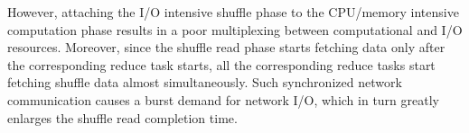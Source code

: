 However, attaching the I/O intensive shuffle phase to the CPU/memory intensive computation phase results in a poor multiplexing between computational and I/O resources.
Moreover, since the shuffle read phase starts fetching data only after the corresponding reduce task starts, all the corresponding reduce tasks start fetching shuffle data almost simultaneously.
Such synchronized network communication causes a burst demand for network I/O, which in turn greatly enlarges the shuffle read completion time. 
{\color{black}
}


